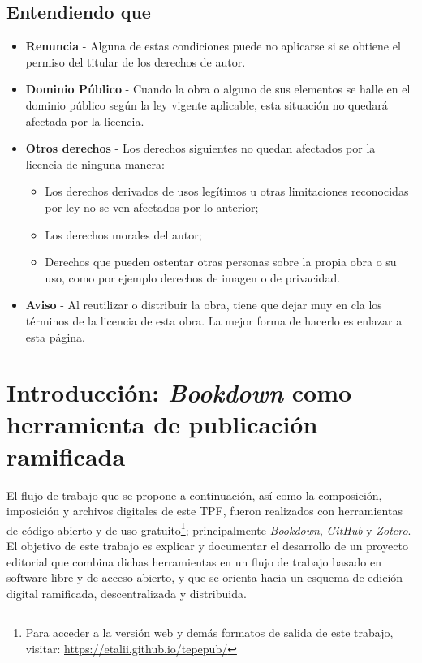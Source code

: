 \documentclass[
]{krantz}
\begin{document}
\hypertarget{entendiendo-que}{%
\section*{Entendiendo que}\label{entendiendo-que}}


\begin{itemize}
\item
  \textbf{Renuncia} - Alguna de estas condiciones puede no aplicarse si se obtiene
  el permiso del titular de los derechos de autor.
\item
  \textbf{Dominio Público} - Cuando la obra o alguno de sus elementos se halle en
  el dominio público según la ley vigente aplicable, esta situación no quedará
  afectada por la licencia.
\item
  \textbf{Otros derechos} - Los derechos siguientes no quedan afectados por
  la licencia de ninguna manera:

  \begin{itemize}
  \item
    Los derechos derivados de usos legítimos u otras limitaciones
    reconocidas por ley no se ven afectados por lo anterior;
  \item
    Los derechos morales del autor;
  \item
    Derechos que pueden ostentar otras personas sobre la propia obra o
    su uso, como por ejemplo derechos de imagen o de privacidad.
  \end{itemize}
\item
  \textbf{Aviso} - Al reutilizar o distribuir la obra, tiene que dejar muy en cla
  los términos de la licencia de esta obra. La mejor forma de hacerlo es
  enlazar a esta página.
\end{itemize}

\hypertarget{intro}{%
\chapter{\texorpdfstring{Introducción: \emph{Bookdown} como herramienta de publicación ramificada}{Introducción: Bookdown como herramienta de publicación ramificada}}\label{intro}}

El flujo de trabajo que se propone a continuación, así como la composición, imposición y archivos digitales de este TPF, fueron realizados con herramientas de código abierto y de uso gratuito\footnote{Para acceder a la versión web y demás formatos de salida de este trabajo, visitar: \url{https://etalii.github.io/tepepub/}}; principalmente \emph{Bookdown}, \emph{GitHub} y \emph{Zotero}. El objetivo de este trabajo es explicar y documentar el desarrollo de un proyecto editorial que combina dichas herramientas en un flujo de trabajo basado en software libre y de acceso abierto, y que se orienta hacia un esquema de edición digital ramificada, descentralizada y distribuida.
\end{document}
